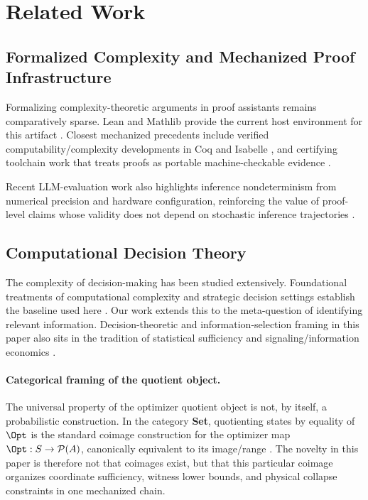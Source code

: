 \section{Related Work}\label{sec:related}

\subsection{Formalized Complexity and Mechanized Proof Infrastructure}

Formalizing complexity-theoretic arguments in proof assistants remains comparatively sparse. Lean and Mathlib provide the current host environment for this artifact \cite{Lean2015,demoura2021lean4,mathlib2020}. Closest mechanized precedents include verified computability/complexity developments in Coq and Isabelle \cite{forster2019verified, kunze2019formal, nipkow2002isabelle, nipkow2014concrete, haslbeck2016verified}, and certifying toolchain work that treats proofs as portable machine-checkable evidence \cite{leroy2009compcert, necula1997proof}.

Recent LLM-evaluation work also highlights inference nondeterminism from numerical precision and hardware configuration, reinforcing the value of proof-level claims whose validity does not depend on stochastic inference trajectories \cite{yuan2025fp32}.

\subsection{Computational Decision Theory}

The complexity of decision-making has been studied extensively. Foundational treatments of computational complexity and strategic decision settings establish the baseline used here \cite{papadimitriou1994complexity,arora2009computational}. Our work extends this to the meta-question of identifying relevant information. Decision-theoretic and information-selection framing in this paper also sits in the tradition of statistical sufficiency and signaling/information economics \cite{fisher1922mathematical, spence1973job, myerson1979incentive, milgrom1986price, kamenica2011bayesian}.

\paragraph{Categorical framing of the quotient object.}
The universal property of the optimizer quotient object is not, by itself, a probabilistic construction. In the category \textbf{Set}, quotienting states by equality of $\Opt$ is the standard coimage construction for the optimizer map $\Opt : S \to \mathcal{P}(A)$, canonically equivalent to its image/range \cite{maclane1998categories}. The novelty in this paper is therefore not that coimages exist, but that this particular coimage organizes coordinate sufficiency, witness lower bounds, and physical collapse constraints in one mechanized chain.

